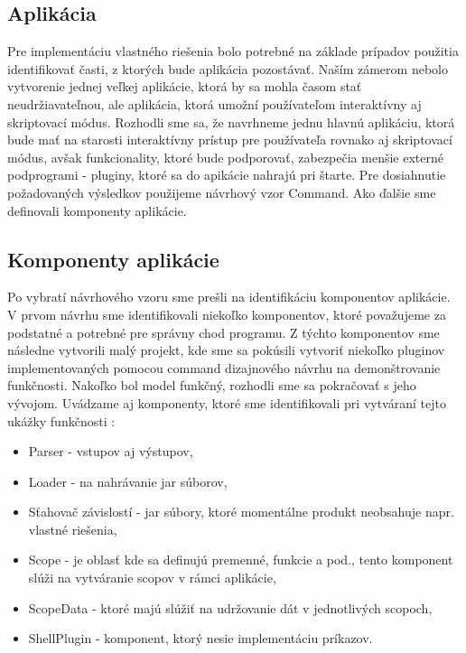 \subsection{Aplikácia}
\indent Pre implementáciu vlastného riešenia bolo potrebné na základe prípadov použitia identifikovať časti, z ktorých bude aplikácia pozostávať. Naším zámerom nebolo vytvorenie jednej veľkej aplikácie, ktorá by sa mohla časom stať neudržiavateľnou, ale aplikácia, ktorá umožní používateľom interaktívny aj skriptovací módus. Rozhodli sme sa, že navrhneme jednu hlavnú aplikáciu, ktorá bude mať na starosti interaktívny prístup pre používateľa rovnako aj skriptovací módus, avšak funkcionality, ktoré bude podporovať, zabezpečia menšie externé podprogrami - pluginy, ktoré sa do apikácie nahrajú pri štarte. Pre dosiahnutie požadovaných výsledkov použijeme návrhový vzor Command. Ako ďalšie sme definovali komponenty aplikácie.

\subsection{Komponenty aplikácie}
\indent Po vybratí návrhového vzoru sme prešli na identifikáciu komponentov aplikácie. V prvom návrhu sme identifikovali niekoľko komponentov, ktoré považujeme za podstatné a potrebné pre správny chod programu. Z týchto komponentov sme následne vytvorili malý projekt, kde sme sa pokúsili vytvoriť niekoľko pluginov implementovaných pomocou command dizajnového návrhu na demonštrovanie funkčnosti. Nakoľko bol model funkčný, rozhodli sme sa pokračovať s jeho vývojom. Uvádzame aj komponenty, ktoré sme identifikovali pri vytváraní tejto ukážky funkčnosti : 
\begin{itemize}
	\item Parser - vstupov aj výstupov,
	\item Loader - na nahrávanie  \acrshort{jar} súborov,
	\item Sťahovač závislostí - \acrshort{jar} súbory, ktoré momentálne produkt neobsahuje napr. vlastné riešenia,
	\item Scope - je oblasť kde sa definujú premenné, funkcie a pod., tento komponent slúži na vytváranie scopov v rámci aplikácie,
	\item ScopeData - ktoré majú slúžiť na udržovanie dát v jednotlivých scopoch,
	\item ShellPlugin - komponent, ktorý nesie implementáciu príkazov.
\end{itemize}

